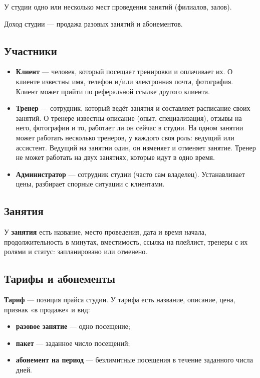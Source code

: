 \documentclass[14pt,a4paper]{extarticle}
\begin{document}
У студии одно или несколько мест проведения занятий (филиалов, залов).

Доход студии --- продажа разовых занятий и абонементов.

\subsection{Участники}

\begin{itemize}
  \item \textbf{Клиент} --- человек, который посещает тренировки и оплачивает их. О клиенте известны имя, телефон и/или электронная почта, фотография. Клиент может прийти по реферальной ссылке другого клиента.
  \item \textbf{Тренер} --- сотрудник, который ведёт занятия и составляет расписание своих занятий. О тренере известны описание (опыт, специализация), отзывы на него, фотографии и то, работает ли он сейчас в студии. На одном занятии может работать несколько тренеров, у каждого своя роль: ведущий или ассистент. Ведущий на занятии один, он изменяет и отменяет занятие. Тренер не может работать на двух занятиях, которые идут в одно время.
  \item \textbf{Администратор} --- сотрудник студии (часто сам владелец). Устанавливает цены, разбирает спорные ситуации с клиентами.
\end{itemize}

\subsection{Занятия}

У \textbf{занятия} есть название, место проведения, дата и время начала, продолжительность в минутах, вместимость, ссылка на плейлист, тренеры с их ролями и статус: запланировано или отменено.

\subsection{Тарифы и абонементы}

\textbf{Тариф} --- позиция прайса студии. У тарифа есть название, описание, цена, признак «в продаже» и вид:
\begin{itemize}
  \item \textbf{разовое занятие} --- одно посещение;
  \item \textbf{пакет} --- заданное число посещений;
  \item \textbf{абонемент на период} --- безлимитные посещения в течение заданного числа дней.
\end{itemize}
\end{document}
